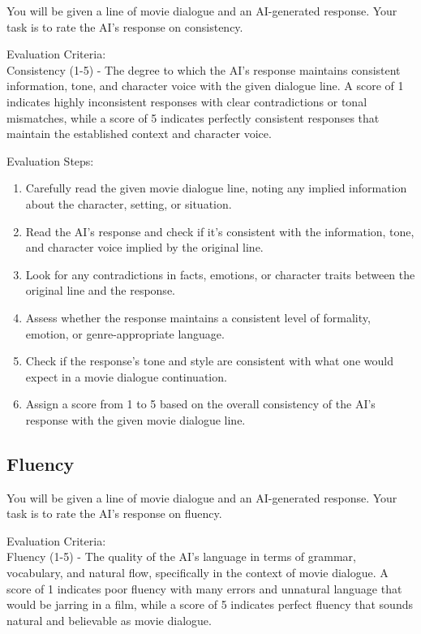 \documentclass[stu,donotrepeattitle,floatsintext]{apa7}
\begin{document}
\begin{appendices}
        \noindent You will be given a line of movie dialogue and an AI-generated response.
        Your task is to rate the AI's response on consistency.

        \bigskip
        \noindent Evaluation Criteria:\\
        \noindent Consistency (1-5) - The degree to which the AI's response maintains consistent information, tone, and character voice with the given dialogue line.
        A score of 1 indicates highly inconsistent responses with clear contradictions or tonal mismatches, while a score of 5 indicates perfectly consistent responses that maintain the established context and character voice.

        \bigskip
        \noindent Evaluation Steps:
        \begin{enumerate}
            \item Carefully read the given movie dialogue line, noting any implied information about the character, setting, or situation.
            \item Read the AI's response and check if it's consistent with the information, tone, and character voice implied by the original line.
            \item Look for any contradictions in facts, emotions, or character traits between the original line and the response.
            \item Assess whether the response maintains a consistent level of formality, emotion, or genre-appropriate language.
            \item Check if the response's tone and style are consistent with what one would expect in a movie dialogue continuation.
            \item Assign a score from 1 to 5 based on the overall consistency of the AI's response with the given movie dialogue line.
        \end{enumerate}

        \subsection{Fluency}\label{subsec:g-eval-fluency}

        \noindent You will be given a line of movie dialogue and an AI-generated response.
        Your task is to rate the AI's response on fluency.

        \bigskip
        \noindent Evaluation Criteria:\\
        \noindent Fluency (1-5) - The quality of the AI's language in terms of grammar, vocabulary, and natural flow, specifically in the context of movie dialogue.
        A score of 1 indicates poor fluency with many errors and unnatural language that would be jarring in a film, while a score of 5 indicates perfect fluency that sounds natural and believable as movie dialogue.


\end{appendices}
\end{document}
